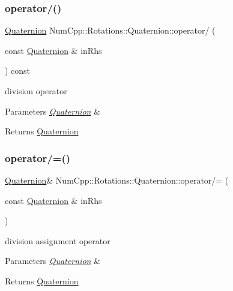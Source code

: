 \subsubsection{\texorpdfstring{operator/()}{operator/()}}
{\footnotesize\ttfamily \mbox{\hyperlink{class_num_cpp_1_1_rotations_1_1_quaternion}{Quaternion}} Num\+Cpp\+::\+Rotations\+::\+Quaternion\+::operator/ (\begin{DoxyParamCaption}\item[{const \mbox{\hyperlink{class_num_cpp_1_1_rotations_1_1_quaternion}{Quaternion}} \&}]{in\+Rhs }\end{DoxyParamCaption}) const\hspace{0.3cm}{\ttfamily [inline]}}

division operator


\begin{DoxyParams}{Parameters}
{\em \mbox{\hyperlink{class_num_cpp_1_1_rotations_1_1_quaternion}{Quaternion}}} & \\
\hline
\end{DoxyParams}
\begin{DoxyReturn}{Returns}
\mbox{\hyperlink{class_num_cpp_1_1_rotations_1_1_quaternion}{Quaternion}} 
\end{DoxyReturn}
\mbox{\label{class_num_cpp_1_1_rotations_1_1_quaternion_af8c32b0d46875ff17e6731c4a4a28c78}} 
\subsubsection{\texorpdfstring{operator/=()}{operator/=()}}
{\footnotesize\ttfamily \mbox{\hyperlink{class_num_cpp_1_1_rotations_1_1_quaternion}{Quaternion}}\& Num\+Cpp\+::\+Rotations\+::\+Quaternion\+::operator/= (\begin{DoxyParamCaption}\item[{const \mbox{\hyperlink{class_num_cpp_1_1_rotations_1_1_quaternion}{Quaternion}} \&}]{in\+Rhs }\end{DoxyParamCaption})\hspace{0.3cm}{\ttfamily [inline]}}

division assignment operator


\begin{DoxyParams}{Parameters}
{\em \mbox{\hyperlink{class_num_cpp_1_1_rotations_1_1_quaternion}{Quaternion}}} & \\
\hline
\end{DoxyParams}
\begin{DoxyReturn}{Returns}
\mbox{\hyperlink{class_num_cpp_1_1_rotations_1_1_quaternion}{Quaternion}} 
\end{DoxyReturn}
\mbox{\label{class_num_cpp_1_1_rotations_1_1_quaternion_a6060fb86327e0c1f429e9e40612f6467}} 
